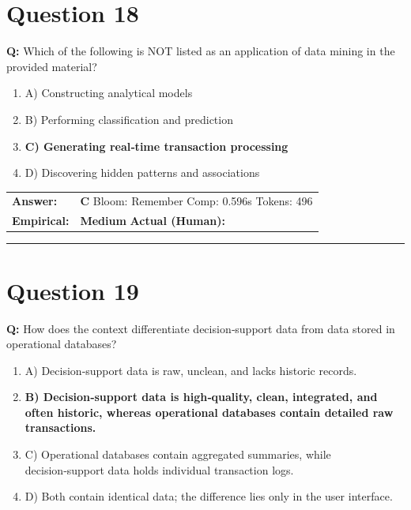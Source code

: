 \documentclass[9pt]{article}
\begin{document}
\section*{Question 18}

\textbf{Q:} Which of the following is NOT listed as an application of data mining in the provided material?

\begin{enumerate}[label=\textbf{\alph{*})}, nosep]
    \item A) Constructing analytical models
    \item B) Performing classification and prediction
    \item \textbf{C) Generating real‑time transaction processing} %
    \item D) Discovering hidden patterns and associations

\end{enumerate}

\begin{tabular}{@{}l p{10.5cm}@{}}
\textbf{Answer:} & \textbf{C} \hspace{1em} Bloom: Remember \hspace{1em} Comp: 0.596s \hspace{1em} Tokens: 496 \\
\textbf{Empirical:} & \textbf{Medium} \hspace{1em} \textbf{Actual (Human):} \underline{\hspace{5cm}}
\end{tabular}

\vspace{0.2cm}
\rule{\textwidth}{0.4pt}
\vspace{0.2cm}


\section*{Question 19}

\textbf{Q:} How does the context differentiate decision‑support data from data stored in operational databases?

\begin{enumerate}[label=\textbf{\alph{*})}, nosep]
    \item A) Decision‑support data is raw, unclean, and lacks historic records.
    \item \textbf{B) Decision‑support data is high‑quality, clean, integrated, and often historic, whereas operational databases contain detailed raw transactions.} %
    \item C) Operational databases contain aggregated summaries, while decision‑support data holds individual transaction logs.
    \item D) Both contain identical data; the difference lies only in the user interface.

\end{enumerate}
\end{document}
